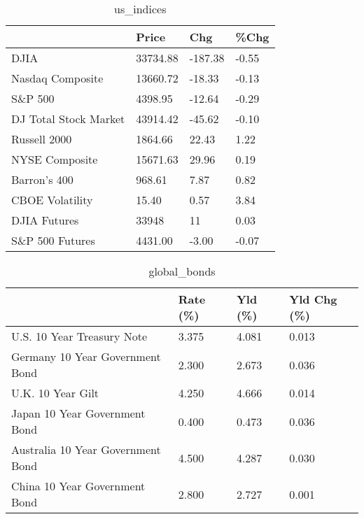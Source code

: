 \documentclass{article}%
\begin{document}
%


\begin{table}[htbp]%
\caption{us\_indices}%
\centering%
\begin{adjustbox}{width=1\textwidth}%
\begin{tabular}{llll}
\toprule
                      &    Price &     Chg &  \%Chg \\
\midrule
                 DJIA & 33734.88 & -187.38 & -0.55 \\
     Nasdaq Composite & 13660.72 &  -18.33 & -0.13 \\
              S\&P 500 &  4398.95 &  -12.64 & -0.29 \\
DJ Total Stock Market & 43914.42 &  -45.62 & -0.10 \\
         Russell 2000 &  1864.66 &   22.43 &  1.22 \\
       NYSE Composite & 15671.63 &   29.96 &  0.19 \\
         Barron's 400 &   968.61 &    7.87 &  0.82 \\
      CBOE Volatility &    15.40 &    0.57 &  3.84 \\
         DJIA Futures &    33948 &      11 &  0.03 \\
      S\&P 500 Futures &  4431.00 &   -3.00 & -0.07 \\
\bottomrule
\end{tabular}
%
\end{adjustbox}%
\end{table}

%


\begin{table}[htbp]%
\caption{global\_bonds}%
\centering%
\begin{adjustbox}{width=1\textwidth}%
\begin{tabular}{llll}
\toprule
                                  & Rate (\%) & Yld (\%) & Yld Chg (\%) \\
\midrule
       U.S. 10 Year Treasury Note &    3.375 &   4.081 &       0.013 \\
  Germany 10 Year Government Bond &    2.300 &   2.673 &       0.036 \\
                U.K. 10 Year Gilt &    4.250 &   4.666 &       0.014 \\
    Japan 10 Year Government Bond &    0.400 &   0.473 &       0.036 \\
Australia 10 Year Government Bond &    4.500 &   4.287 &       0.030 \\
    China 10 Year Government Bond &    2.800 &   2.727 &       0.001 \\
\bottomrule
\end{tabular}
%
\end{adjustbox}%
\end{table}
\end{document}
